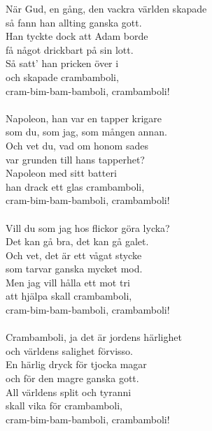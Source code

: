 \vspace{10pt}
När Gud, en gång, den vackra världen skapade\\
så fann han allting ganska gott.\\
Han tyckte dock att Adam borde\\
få något drickbart på sin lott.\\
Så satt' han pricken över i\\
och skapade crambamboli,\\
cram-bim-bam-bamboli, crambamboli!\\
\\
Napoleon, han var en tapper krigare\\
som du, som jag, som mången annan.\\
Och vet du, vad om honom sades\\
var grunden till hans tapperhet?\\
Napoleon med sitt batteri\\
han drack ett glas crambamboli,\\
cram-bim-bam-bamboli, crambamboli!\\
\\
Vill du som jag hos flickor göra lycka?\\
Det kan gå bra, det kan gå galet.\\
Och vet, det är ett vågat stycke\\
som tarvar ganska mycket mod.\\
Men jag vill hålla ett mot tri\\
att hjälpa skall crambamboli,\\
cram-bim-bam-bamboli, crambamboli!\\
\\
Crambamboli, ja det är jordens härlighet\\
och världens salighet förvisso.\\
En härlig dryck för tjocka magar\\
och för den magre ganska gott.\\
All världens split och tyranni\\
skall vika för crambamboli,\\
cram-bim-bam-bamboli, crambamboli!
